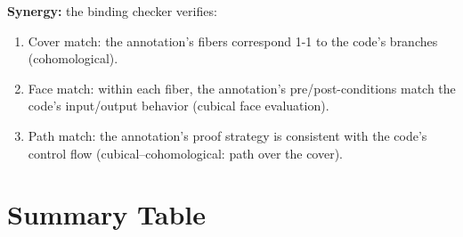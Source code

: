 \documentclass[11pt,a4paper]{article}
\theoremstyle{definition}
\theoremstyle{plain}
\begin{document}
\textbf{Synergy:} the binding checker verifies:
\begin{enumerate}
\item Cover match: the annotation's fibers correspond 1-1 to the
  code's branches (cohomological).
\item Face match: within each fiber, the annotation's
  pre/post-conditions match the code's input/output behavior
  (cubical face evaluation).
\item Path match: the annotation's proof strategy is consistent
  with the code's control flow (cubical--cohomological: path over
  the cover).
\end{enumerate}


\section{Summary Table}
\label{sec:syn-summary}
\end{document}
